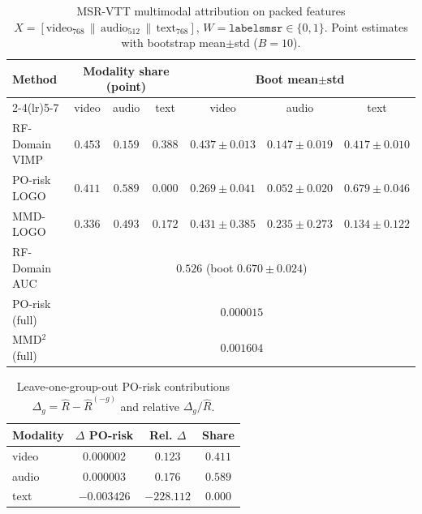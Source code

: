 
\begin{table}[ht]
\centering
\caption{MSR-VTT multimodal attribution on packed features $X=[\mathrm{video}_{768}\,\|\,\mathrm{audio}_{512}\,\|\,\mathrm{text}_{768}]$, $W=\texttt{labelsmsr}\in\{0,1\}$. Point estimates with bootstrap mean$\pm$std ($B=10$).}
\label{tab:msrvtt-mm-share}
\small
\begin{tabular}{@{}l ccc ccc@{}}
\toprule
Method & \multicolumn{3}{c}{Modality share (point)} & \multicolumn{3}{c}{Boot mean$\pm$std} \\
\cmidrule(lr){2-4}\cmidrule(lr){5-7}
 & video & audio & text & video & audio & text \\
\midrule
RF-Domain VIMP & $0.453$ & $0.159$ & $0.388$ & $0.437\pm0.013$ & $0.147\pm0.019$ & $0.417\pm0.010$ \\
PO-risk LOGO & $0.411$ & $0.589$ & $0.000$ & $0.269\pm0.041$ & $0.052\pm0.020$ & $0.679\pm0.046$ \\
MMD-LOGO & $0.336$ & $0.493$ & $0.172$ & $0.431\pm0.385$ & $0.235\pm0.273$ & $0.134\pm0.122$ \\
\midrule
RF-Domain AUC & \multicolumn{6}{c}{$0.526$ (boot $0.670\pm0.024$)} \\
PO-risk (full) & \multicolumn{6}{c}{$0.000015$} \\
MMD$^2$ (full) & \multicolumn{6}{c}{$0.001604$} \\
\bottomrule
\end{tabular}
\end{table}

\begin{table}[ht]
\centering
\caption{Leave-one-group-out PO-risk contributions $\Delta_g=\widehat R-\widehat R^{(-g)}$ and relative $\Delta_g/\widehat R$.}
\label{tab:msrvtt-logo-po}
\small
\begin{tabular}{@{}l c c c@{}}
\toprule
Modality & $\Delta$ PO-risk & Rel. $\Delta$ & Share \\
\midrule
video & $0.000002$ & $0.123$ & $0.411$ \\
audio & $0.000003$ & $0.176$ & $0.589$ \\
text & $-0.003426$ & $-228.112$ & $0.000$ \\
\bottomrule
\end{tabular}
\end{table}

